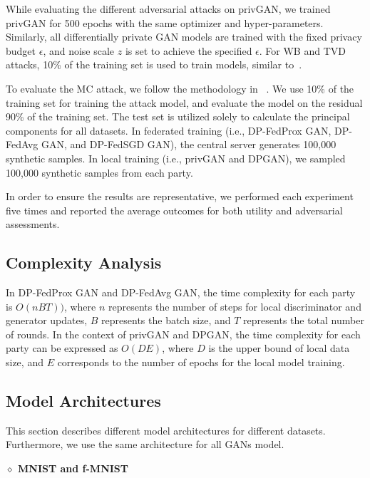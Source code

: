  While evaluating the different adversarial attacks on privGAN, we trained privGAN for 500 epochs with the same optimizer and hyper-parameters. Similarly, all differentially private GAN models are trained with the fixed privacy budget $\epsilon$, and noise scale $z$ is set to achieve the specified $\epsilon$.  For WB and TVD attacks, 10\% of the training set is used to train models, similar to~\cite{WBAttack2018}. 
 
 To evaluate the MC attack, we follow the methodology in ~\cite{PrivGAN2019, MCAttackHilprecht2019}.  We use 10\% of the training set for training the attack model, and evaluate the model on the residual 90\% of the training set.  The test set is utilized solely to calculate the principal components for all datasets.  In federated training (i.e.,  DP-FedProx GAN, DP-FedAvg GAN, and DP-FedSGD GAN), the central server generates 100,000 synthetic samples.  In local training (i.e., privGAN and DPGAN), we sampled 100,000 synthetic samples from each party. 
 
In order to ensure the results are representative, we performed each experiment five times and reported the average outcomes for both utility and adversarial assessments. 

\subsection{Complexity Analysis}


In DP-FedProx GAN and DP-FedAvg GAN, the time complexity for each party is $O(nBT))$, where $n$ represents the number of steps for local discriminator and generator updates, $B$ represents the batch size, and $T$ represents the total number of rounds.  In the context of privGAN and DPGAN, the time complexity for each party can be expressed as $O(DE)$, where  $D$ is the upper bound of local data size, and $E$ corresponds to the number of epochs for the local model training.



\subsection{Model Architectures}

This section describes different model architectures for different datasets. Furthermore, we use the same architecture for all GANs model. 

\textbf{$\diamond$ MNIST and f-MNIST}

